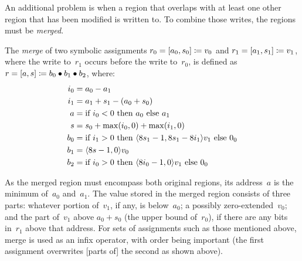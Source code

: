 An additional problem is when a region that overlaps with at least one other region
that has been modified is written to.
To combine those writes, the regions must be \emph{merged}.%
\begin{definition}\label{def:merge}
  The \emph{merge} of two symbolic assignments
  $r_0=[a_0,s_0]\coloneqq v_0$ and $r_1=[a_1,s_1]\coloneqq v_1$,
  where the write to~$r_1$ occurs before the write to~$r_0$,
  is defined as $r=[a,s]\coloneqq b_0\bullet b_1\bullet b_2$, where:
  \begin{align*}
  i_0 &= a_0 - a_1 \\
  i_1 &= a_1 + s_1 - (a_0 + s_0) \\
  a   &= \text{if } i_0 < 0 \text{ then } a_0 \text{ else } a_1 \\
  s   &= s_0 + \max(i_0, 0) + \max(i_1, 0) \\
  b_0 &= \text{if } i_1 > 0 \text{ then }
  \langle8 s_1-1,8 s_1 - 8 i_1\rangle v_1 \text{ else } 0_0 \\
  b_1 &= \langle8 s-1, 0\rangle v_0 \\
  b_2 &= \text{if } i_0 > 0 \text{ then } \langle8 i_0-1, 0\rangle v_1 \text{ else } 0_0
  \end{align*}
\end{definition}
As the merged region must encompass both original regions,
its address~$a$ is the minimum of~$a_0$ and~$a_1$.
The value stored in the merged region consists of three parts:
whatever portion of~$v_1$, if any, is below~$a_0$;
a possibly zero-extended~$v_0$;
and the part of~$v_1$ above $a_0+s_0$ (the upper bound of~$r_0$),
if there are any bits in~$r_1$ above that address.
For sets of assignments such as those mentioned above,
merge is used as an infix operator, with order being important
(the first assignment overwrites [parts of] the second as shown above).

